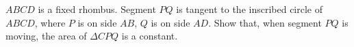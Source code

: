$ABCD$ is a fixed rhombus. Segment $PQ$ is tangent to the inscribed circle of $ABCD$,  where $P$ is on side $AB$,  $Q$ is on side $AD$. Show that, when segment $PQ$ is moving, the area of $\Delta CPQ$ is a constant.